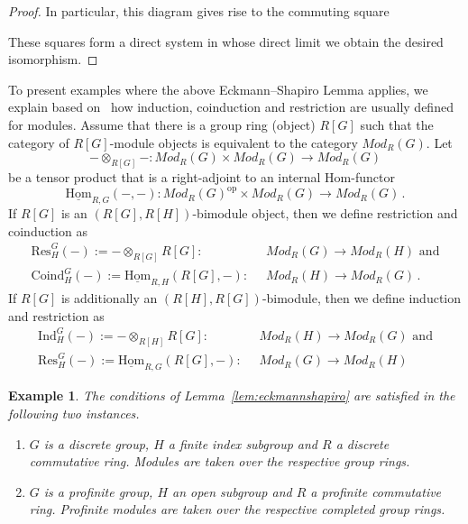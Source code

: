 \documentclass[12pt, a4paper]{article}
\numberwithin{equation}{section}
\newtheorem{exl}[thm]{Example}
\theoremstyle{empty}
\theoremstyle{nonumberplain}
\newtheorem{proof}{Proof}
\begin{document}
\begin{proof}
In particular, this diagram gives rise to the commuting square
\begin{center}
\end{center}
These squares form a direct system in whose direct limit we obtain the desired isomorphism.
\end{proof}

To present examples where the above Eckmann--Shapiro Lemma applies, we explain based on~\cite[p.~62--63 and p.~67]{bro82} how induction, coinduction and restriction are usually defined for modules. Assume that there is a group ring (object) $R[G]$ such that the category of $R[G]$-module objects is equivalent to the category $Mod_R(G)$. Let
\[ - \otimes_{R[G]} -: Mod_R(G) \times Mod_R(G) \rightarrow Mod_R(G) \]
be a tensor product that is a right-adjoint to an internal Hom-functor
\[ \underline{\mathrm{Hom}}_{R, G}(-, -): Mod_R(G)^{\mathrm{op}} \times Mod_R(G) \rightarrow Mod_R(G) \, . \]
If $R[G]$ is an $(R[G], R[H])$-bimodule object, then we define restriction and coinduction as
\begin{align*}
\mathrm{Res}_H^G(-) := - \otimes_{R[G]} R[G]: \; \; &Mod_R(G) \rightarrow Mod_R(H) \text{ and} \\
\mathrm{Coind}_H^G(-) := \underline{\mathrm{Hom}}_{R, H}(R[G], -): \; \; &Mod_R(H) \rightarrow Mod_R(G) \, .
\end{align*}
If $R[G]$ is additionally an $(R[H], R[G])$-bimodule, then we define induction and restriction as
\begin{align*}
\mathrm{Ind}_H^G(-) := - \otimes_{R[H]} R[G]: \; \; &Mod_R(H) \rightarrow Mod_R(G) \text{ and} \\
\mathrm{Res}_H^G(-) := \underline{\mathrm{Hom}}_{R, G}(R[G], -): \; \; &Mod_R(G) \rightarrow Mod_R(H)
\end{align*}

\begin{exl}\label{exl:eckmannshapiro}
The conditions of Lemma~\ref{lem:eckmannshapiro} are satisfied in the following two instances.
\begin{enumerate}
\item $G$ is a discrete group, $H$ a finite index subgroup and $R$ a discrete commutative ring. Modules are taken over the respective group rings.
\item $G$ is a profinite group, $H$ an open subgroup and $R$ a profinite commutative ring. Profinite modules are taken over the respective completed group rings.
\end{enumerate}
\end{exl}
\end{document}
